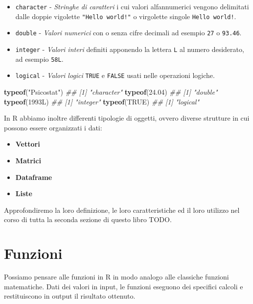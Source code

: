 \documentclass[
]{book}
\newenvironment{Shaded}{\begin{snugshade}}{\end{snugshade}}
\newcommand{\CommentTok}[1]{\textcolor[rgb]{0.56,0.35,0.01}{\textit{#1}}}
\newcommand{\FloatTok}[1]{\textcolor[rgb]{0.00,0.00,0.81}{#1}}
\newcommand{\KeywordTok}[1]{\textcolor[rgb]{0.13,0.29,0.53}{\textbf{#1}}}
\newcommand{\NormalTok}[1]{#1}
\newcommand{\OtherTok}[1]{\textcolor[rgb]{0.56,0.35,0.01}{#1}}
\newcommand{\StringTok}[1]{\textcolor[rgb]{0.31,0.60,0.02}{#1}}
\providecommand{\tightlist}{%
  \setlength{\itemsep}{0pt}\setlength{\parskip}{0pt}}
\begin{document}
\begin{itemize}
\tightlist
\item
  \texttt{character} - \emph{Stringhe di caratteri} i cui valori alfannumerici vengono delimitati dalle doppie vigolette \texttt{"Hello\ world!"} o virgolette singole \texttt{\textquotesingle{}Hello\ world!\textquotesingle{}}.
\item
  \texttt{double} - \emph{Valori numerici} con o senza cifre decimali ad esempio \texttt{27} o \texttt{93.46}.
\item
  \texttt{integer} - \emph{Valori interi} definiti apponendo la lettera \texttt{L} al numero desiderato, ad esempio \texttt{58L}.
\item
  \texttt{logical} - \emph{Valori logici} \texttt{TRUE} e \texttt{FALSE} usati nelle operazioni logiche.
\end{itemize}

\begin{Shaded}
\begin{Highlighting}[]
\KeywordTok{typeof}\NormalTok{(}\StringTok{"Psicostat"}\NormalTok{)}
\CommentTok{## [1] "character"}
\KeywordTok{typeof}\NormalTok{(}\FloatTok{24.04}\NormalTok{)}
\CommentTok{## [1] "double"}
\KeywordTok{typeof}\NormalTok{(1993L)}
\CommentTok{## [1] "integer"}
\KeywordTok{typeof}\NormalTok{(}\OtherTok{TRUE}\NormalTok{)}
\CommentTok{## [1] "logical"}
\end{Highlighting}
\end{Shaded}

In R abbiamo inoltre differenti tipologie di oggetti, ovvero diverse strutture in cui possono essere organizzati i dati:

\begin{itemize}
\tightlist
\item
  \textbf{Vettori}
\item
  \textbf{Matrici}
\item
  \textbf{Dataframe}
\item
  \textbf{Liste}
\end{itemize}

Approfondiremo la loro definizione, le loro caratteristiche ed il loro utilizzo nel corso di tutta la seconda sezione di questo libro TODO.

\hypertarget{functions-def}{%
\section{Funzioni}\label{functions-def}}

Possiamo pensare alle funzioni in R in modo analogo alle classiche funzioni matematiche. Dati dei valori in input, le funzioni eseguono dei specifici calcoli e restituiscono in output il risultato ottenuto.
\end{document}
